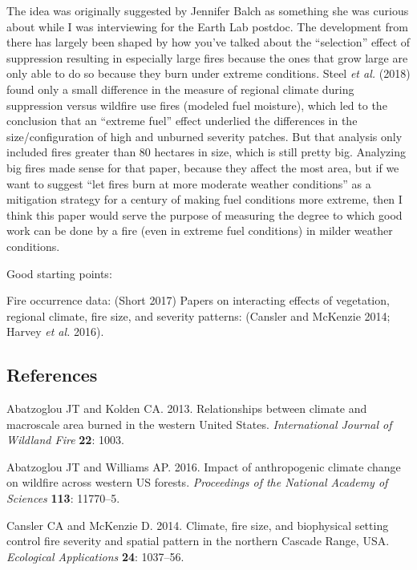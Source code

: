 \documentclass[]{article}
\begin{document}
The idea was originally suggested by Jennifer Balch as something she was
curious about while I was interviewing for the Earth Lab postdoc. The
development from there has largely been shaped by how you've talked
about the ``selection'' effect of suppression resulting in especially
large fires because the ones that grow large are only able to do so
because they burn under extreme conditions. Steel \emph{et al.} (2018)
found only a small difference in the measure of regional climate during
suppression versus wildfire use fires (modeled fuel moisture), which led
to the conclusion that an ``extreme fuel'' effect underlied the
differences in the size/configuration of high and unburned severity
patches. But that analysis only included fires greater than 80 hectares
in size, which is still pretty big. Analyzing big fires made sense for
that paper, because they affect the most area, but if we want to suggest
``let fires burn at more moderate weather conditions'' as a mitigation
strategy for a century of making fuel conditions more extreme, then I
think this paper would serve the purpose of measuring the degree to
which good work can be done by a fire (even in extreme fuel conditions)
in milder weather conditions.

Good starting points:

Fire occurrence data: (Short 2017) Papers on interacting effects of
vegetation, regional climate, fire size, and severity patterns: (Cansler
and McKenzie 2014; Harvey \emph{et al.} 2016).

\subsection*{References}\label{references}

\hypertarget{refs}{}
\hypertarget{ref-abatzoglou2013a}{}
Abatzoglou JT and Kolden CA. 2013. Relationships between climate and
macroscale area burned in the western United States. \emph{International
Journal of Wildland Fire} \textbf{22}: 1003.

\hypertarget{ref-abatzoglou2016}{}
Abatzoglou JT and Williams AP. 2016. Impact of anthropogenic climate
change on wildfire across western US forests. \emph{Proceedings of the
National Academy of Sciences} \textbf{113}: 11770--5.

\hypertarget{ref-cansler2014}{}
Cansler CA and McKenzie D. 2014. Climate, fire size, and biophysical
setting control fire severity and spatial pattern in the northern
Cascade Range, USA. \emph{Ecological Applications} \textbf{24}:
1037--56.
\end{document}
